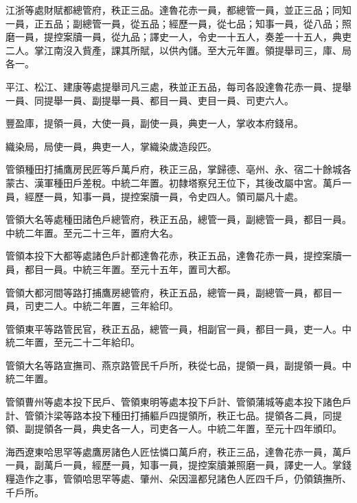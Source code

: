 \begin{pinyinscope}
 江浙等處財賦都總管府，秩正三品。達魯花赤一員，都總管一員，並正三品；同知一員，正五品；副總管一員，從五品；經歷一員，從七品；知事一員，從八品；照磨一員，提控案牘一員，從九品；譯史一人，令史一十五人，奏差一十五人，典吏二人。掌江南沒入貲產，課其所賦，以供內儲。至大元年置。領提舉司三，庫、局各一。



 平江、松江、建康等處提舉司凡三處，秩並正五品，每司各設達魯花赤一員、提舉一員、同提舉一員、副提舉一員、都目一員、吏目一員、司吏六人。



 豐盈庫，提領一員，大使一員，副使一員，典吏一人，掌收本府錢帛。



 織染局，局使一員，典吏一人，掌織染歲造段匹。



 管領種田打捕鷹房民匠等戶萬戶府，秩正三品，掌歸德、亳州、永、宿二十餘城各蒙古、漢軍種田戶差稅。中統二年置。初隸塔察兒王位下，其後改屬中宮。萬戶一員，經歷一員，知事一員，提控案牘一員，令史四人。領司屬凡十處。



 管領大名等處種田諸色戶總管府，秩正五品，總管一員，副總管一員，都目一員。中統二年置。至元二十三年，置府大名。



 管領本投下大都等處諸色戶計都達魯花赤，秩正五品，達魯花赤一員，提控案牘一員，都目一員。中統三年置。至元十五年，置司大都。



 管領大都河間等路打捕鷹房總管府，秩正五品，總管一員，副總管一員，都目一員，司吏二人。中統二年置，三年給印。



 管領東平等路管民官，秩正五品，總管一員，相副官一員，都目一員，吏一人。中統二年置，至元二十二年給印。



 管領大名等路宣撫司、燕京路管民千戶所，秩從七品，提領一員，副提領一員。中統二年置。



 管領曹州等處本投下民戶、管領東明等處本投下戶計、管領蒲城等處本投下諸色戶計、管領汴梁等路本投下種田打捕軀戶四提領所，秩正七品。提領各二員，同提領、副提領各一員，典史各一人，司吏各一人。中統二年置，至元十四年頒印。



 海西遼東哈思罕等處鷹房諸色人匠怯憐口萬戶府，秩正三品，達魯花赤一員，萬戶一員，副萬戶一員，經歷一員，知事一員，提控案牘兼照磨一員，譯史一人。掌錢糧造作之事，管領哈思罕等處、肇州、朵因溫都兒諸色人匠四千戶，仍領鎮撫所、千戶所。




\end{pinyinscope}
